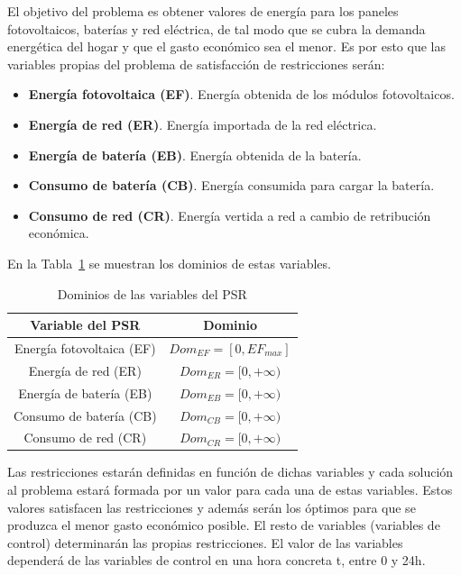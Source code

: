El objetivo del problema es obtener valores de energía para los paneles fotovoltaicos, baterías y red eléctrica, de tal modo que se cubra la demanda energética del hogar y que el gasto económico sea el menor. Es por esto que las variables propias del problema de satisfacción de restricciones serán:
\begin{itemize}
\item \textbf{Energía fotovoltaica (EF)}. Energía obtenida de los módulos fotovoltaicos.
\item \textbf{Energía de red (ER)}. Energía importada de la red eléctrica.
\item \textbf{Energía de batería (EB)}. Energía obtenida de la batería.
\item \textbf{Consumo de batería (CB)}. Energía consumida para cargar la batería.
\item \textbf{Consumo de red (CR)}. Energía vertida a red a cambio de retribución económica.
\end{itemize}
En la Tabla~\ref{tab:domains} se muestran los dominios de estas variables.
\begin{table}[H]
        \centering
        \begin{tabular}{|c|c|}
        \hline
         \textbf{Variable del PSR} & \textbf{Dominio}\\ \hline
          Energía fotovoltaica (\gls{EF}) & $ Dom_{EF} = [0, EF_{max}] $ \\ \hline
          Energía de red (\gls{ER}) & $ Dom_{ER} = [0, +\infty) $\\ \hline
          Energía de batería (\gls{EB}) & $ Dom_{EB} = [0, +\infty) $\\ \hline
          Consumo de batería (\gls{CB}) & $ Dom_{CB} = [0, +\infty) $\\ \hline
          Consumo de red (\gls{CR}) & $ Dom_{CR} = [0, +\infty) $\\ \hline
        \end{tabular}
        \caption{Dominios de las variables del PSR}
        \label{tab:domains}
\end{table}

Las restricciones estarán definidas en función de dichas variables y cada solución al problema estará formada por un valor para cada una de estas variables. Estos valores satisfacen las restricciones y además serán los óptimos para que se produzca el menor gasto económico posible. El resto de variables (variables de control) determinarán las propias restricciones. El valor de las variables dependerá de las variables de control en una hora concreta t, entre 0 y 24h.\\ \\ \\

